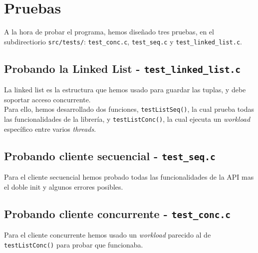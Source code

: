 \section{Pruebas}
A la hora de probar el programa, hemos diseñado tres pruebas, en el subdirectiorio \texttt{src/tests/}: \texttt{test\_conc.c}, \texttt{test\_seq.c} y \texttt{test\_linked\_list.c}.

\subsection{Probando la Linked List - \texttt{test\_linked\_list.c}}
La linked list es la estructura que hemos usado para guardar las tuplas, y debe soportar acceso concurrente.\\

Para ello, hemos desarrollado dos funciones, \texttt{testListSeq()}, la cual prueba todas las funcionalidades de la librería, y \texttt{testListConc()}, la cual ejecuta un \textit{workload} específico entre varios \textit{threads}.

\subsection{Probando cliente secuencial - \texttt{test\_seq.c}}
Para el cliente secuencial hemos probado todas las funcionalidades de la API mas el doble init y algunos errores posibles.

\subsection{Probando cliente concurrente - \texttt{test\_conc.c}}
Para el cliente concurrente hemos usado un \textit{workload} parecido al de \texttt{testListConc()} para probar que funcionaba.
